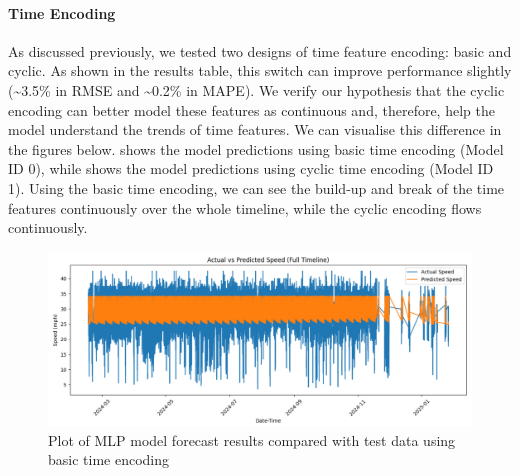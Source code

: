 \begin{table}[!ht]
\centering
\caption{MLP Feature and Performance Comparison}
\label{table:feature_performance_comparison}
\end{table}

\paragraph{Time Encoding}
As discussed previously, we tested two designs of time feature encoding: basic and cyclic. As shown in the results table, this switch can improve performance slightly (\~{}3.5\% in RMSE and \~{}0.2\% in MAPE). We verify our hypothesis that the cyclic encoding can better model these features as continuous and, therefore, help the model understand the trends of time features. We can visualise this difference in the figures below.  shows the model predictions using basic time encoding (Model ID 0), while  shows the model predictions using cyclic time encoding (Model ID 1). Using the basic time encoding, we can see the build-up and break of the time features continuously over the whole timeline, while the cyclic encoding flows continuously.

\begin{figure}[!ht]
  \centering
  \includegraphics[width=\textwidth]{images/results-discussions/non_cyclic.pdf}
  \caption{Plot of MLP model forecast results compared with test data using basic time encoding}
  \label{fig:non-cyclic}
\end{figure}

